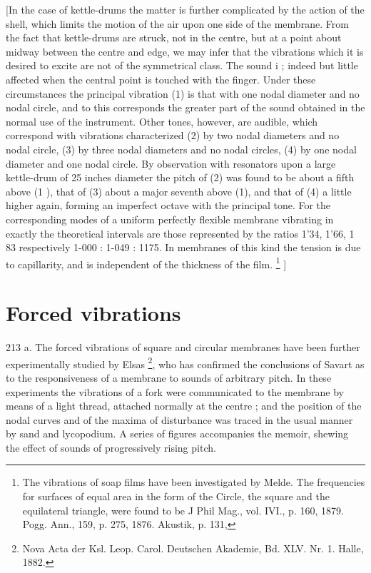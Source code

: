 [In the case of kettle-drums the matter is further complicated by the
action of the shell, which limits the motion of the air upon one side of
the membrane. From the fact that kettle-drums are struck, not in the
centre, but at a point about midway between the centre and edge, we may
infer that the vibrations which it is desired to excite are not of the
symmetrical class. The sound i ; indeed but little affected when the
central point is touched with the finger. Under these circumstances
the principal vibration (1) is that with one nodal diameter and no nodal
circle, and to this corresponds the greater part of the sound obtained
in the normal use of the instrument. Other tones, however, are audible,
which correspond with vibrations characterized (2) by two nodal
diameters and no nodal circle, (3) by three nodal diameters and no nodal
circles, (4) by one nodal diameter and one nodal circle. By observation
with resonators upon a large kettle-drum of 25 inches diameter the pitch
of (2) was found to be about a fifth above (1 ), that of (3) about a
major seventh above (1), and that of (4) a little higher again, forming
an imperfect octave with the principal tone. For the corresponding modes
of a uniform perfectly flexible membrane vibrating in exactly the
theoretical intervals are those represented by the ratios 1'34, 1'66, 1
83 respectively 1-000 : 1-049 : 1175.
In membranes of this kind the tension is due to
capillarity, and is independent of the thickness of the film.
\footnote{The vibrations of soap films have been investigated by Melde. The
frequencies for surfaces of equal area in the form of the Circle, the
square and the equilateral triangle, were found to be J Phil Mag., vol.
IVI., p. 160, 1879. Pogg. Ann., 159, p. 275, 1876. Akustik, p. 131,}
]

\section{Forced vibrations}\label{sect:213a}
213 a.
The forced vibrations of square and circular
membranes have been further experimentally studied by
Elsas \footnote{Nova Acta der Ksl. Leop. Carol. Deutschen Akademie, Bd. XLV. Nr. 1.  Halle, 1882.},
who has confirmed the
conclusions of Savart as to the responsiveness of a membrane to sounds
of arbitrary pitch. In these experiments the vibrations of a fork were
communicated to the membrane by means of a light thread, attached
normally at the centre ; and the position of the nodal curves and of the
maxima of disturbance was traced in the usual manner by sand and
lycopodium. A series of figures accompanies the memoir, shewing the
effect of sounds of progressively rising pitch.


